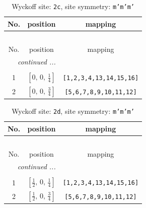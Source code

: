 \documentclass[fleqn,8pt]{jsarticle}
\begin{document}
\renewcommand{\arraystretch}{1.2}
\begin{longtable}{ccc}
\caption{Wyckoff site: {\tt 2c}, site symmetry: {\tt m'm'm'}}
 \\
 \hline \hline
No. & position & mapping \\ \hline \endfirsthead

\multicolumn{2}{l}{\tablename\ \thetable{}} \\
 \hline \hline
No. & position & mapping \\ \hline \endhead

 \hline \hline
\multicolumn{2}{r}{\footnotesize\it continued ...} \\ \endfoot

 \hline \hline
\multicolumn{2}{r}{} \\ \endlastfoot

1 & $\left[ 0,\, 0,\, \frac{1}{4} \right]$ & {\tt [1,2,3,4,13,14,15,16]} \\ \hline
2 & $\left[ 0,\, 0,\, \frac{3}{4} \right]$ & {\tt [5,6,7,8,9,10,11,12]} \\
\end{longtable}
\renewcommand{\arraystretch}{1.2}
\begin{longtable}{ccc}
\caption{Wyckoff site: {\tt 2d}, site symmetry: {\tt m'm'm'}}
 \\
 \hline \hline
No. & position & mapping \\ \hline \endfirsthead

\multicolumn{2}{l}{\tablename\ \thetable{}} \\
 \hline \hline
No. & position & mapping \\ \hline \endhead

 \hline \hline
\multicolumn{2}{r}{\footnotesize\it continued ...} \\ \endfoot

 \hline \hline
\multicolumn{2}{r}{} \\ \endlastfoot

1 & $\left[ \frac{1}{2},\, 0,\, \frac{1}{4} \right]$ & {\tt [1,2,3,4,13,14,15,16]} \\ \hline
2 & $\left[ \frac{1}{2},\, 0,\, \frac{3}{4} \right]$ & {\tt [5,6,7,8,9,10,11,12]} \\
\end{longtable}
\renewcommand{\arraystretch}{1.2}
\end{document}
